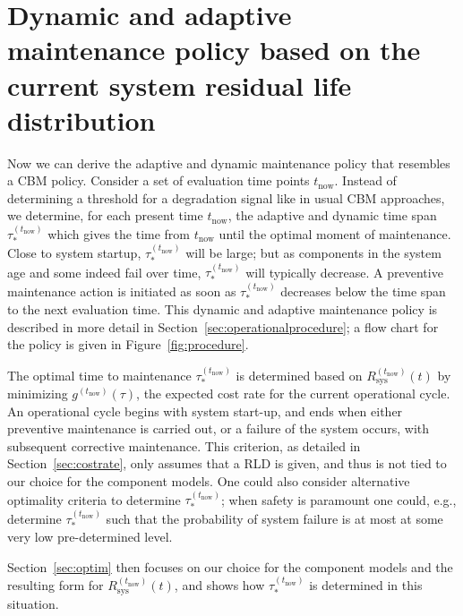 \documentclass[authoryear]{elsarticle}
\def\tnow{t_\text{now}}
\newcommand{\Rsysnow}{R^{(t_\text{now})}_\text{sys}}
\newcommand{\gnow}{g^{(\tnow)}}
\newcommand{\tausnow}{\tau_*^{(\tnow)}}
\newcommand{\tprep}{\tau_{\text{prep}}}
\newcommand{\tthresh}{\tau_{\text{thresh}}}
\begin{document}
\section{Dynamic and adaptive maintenance policy based on the current system residual life distribution}
\label{sec:policy}

Now we can derive the adaptive and dynamic maintenance policy
that resembles a CBM policy.
Consider a set of evaluation time points $\tnow$.
Instead of determining a threshold for a degradation signal like in usual CBM approaches,
we determine, for each present time $\tnow$,
the adaptive and dynamic time span $\tausnow$ which gives the time from $\tnow$ until the optimal moment of maintenance.
Close to system startup, $\tausnow$ will be large;
but as components in the system age and some indeed fail over time,
$\tausnow$ will typically decrease.
A preventive maintenance action is initiated
as soon as $\tausnow$ decreases below the time span to the next evaluation time.
This dynamic and adaptive maintenance policy is described in more detail in Section~\ref{sec:operationalprocedure};
a flow chart for the policy is given in Figure~\ref{fig:procedure}.

The optimal time to maintenance $\tausnow$ is determined based on $\Rsysnow(t)$
by minimizing $\gnow(\tau)$, the expected cost rate for the current operational cycle.
An operational cycle begins with system start-up,
and ends when either preventive maintenance is carried out,
or a failure of the system occurs, with subsequent corrective maintenance.
This criterion, as detailed in Section~\ref{sec:costrate},
only assumes that a RLD is given,
and thus is not tied to our choice for the component models.
One could also consider alternative optimality criteria to determine $\tausnow$;
when safety is paramount one could, e.g., determine $\tausnow$ such that
the probability of system failure is at most at some very low pre-determined level.

Section~\ref{sec:optim} then focuses on our choice for the component models and the resulting form for $\Rsysnow(t)$,
and shows how $\tausnow$ is determined in this situation.
\end{document}
